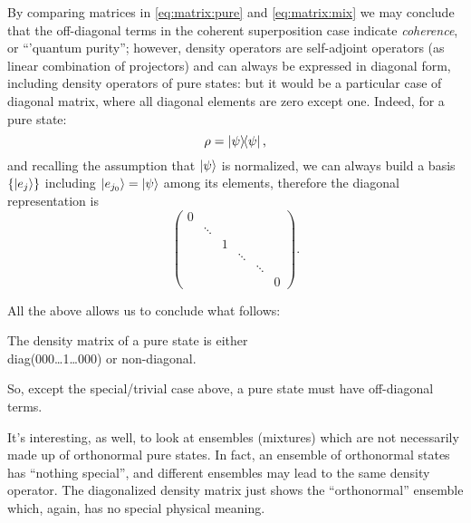 By comparing matrices in \eqref{eq:matrix:pure} and \eqref{eq:matrix:mix}
we may conclude that the off-diagonal terms in the coherent superposition case
indicate \emph{coherence}, or ``'quantum purity'';
however, density operators are self-adjoint operators
(as linear combination of projectors) and can always be expressed in
diagonal form, including density operators of pure states: but it would be
a particular case of diagonal matrix, where all diagonal elements are zero
except one. Indeed, for a pure state:
\[
  \rho = \ketbra{\psi}{\psi}\text{,}
\]
and recalling the assumption that $\ket{\psi}$ is normalized,
we can always build a basis $\qty{\ket{e_j}}$ including $\ket{e_{j_0}} = \ket{\psi}$
among its elements, therefore the diagonal representation is
\[
  \begin{pmatrix}
    0           &       &       &       &       &           \\
                &\ddots &       &       &       &           \\
                &       &1      &       &       &           \\
                &       &       &\ddots &       &           \\
                &       &       &       &\ddots &           \\
                &       &       &       &       &0
  \end{pmatrix}\text{.}
\]

All the above allows us to conclude what follows:
\begin{remark}
  The density matrix of a pure state is either\\
  diag(000\dots1\dots000) or non-diagonal.

  So, except the special/trivial case above, a pure state must have off-diagonal terms.
\end{remark}

It's interesting, as well, to look at ensembles (mixtures)
which are not necessarily made up of orthonormal pure states.
In fact, an ensemble of orthonormal states has ``nothing special'',
and different ensembles may lead to the same density operator.
The diagonalized density matrix just shows the ``orthonormal''
ensemble which, again, has no special physical meaning.

